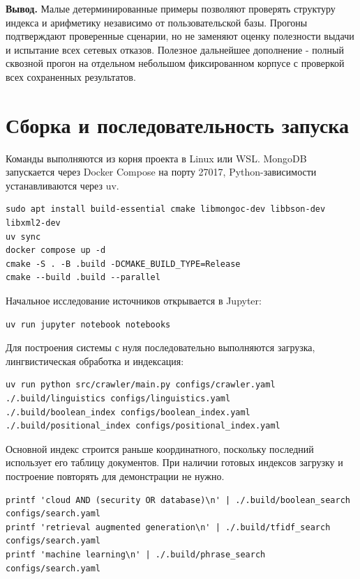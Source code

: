 \documentclass[pdf,unicode,12pt,a4paper,oneside,fleqn]{article}
\newcommand{\partlabel}[1]{\par\Needspace{4\baselineskip}\medskip\textbf{#1.}\quad}
\begin{document}
\partlabel{Вывод}
Малые детерминированные примеры позволяют проверять структуру индекса и
арифметику независимо от пользовательской базы. Прогоны подтверждают
проверенные сценарии, но не заменяют оценку полезности выдачи и испытание
всех сетевых отказов. Полезное дальнейшее дополнение - полный сквозной
прогон на отдельном небольшом фиксированном корпусе с проверкой всех
сохраненных результатов.

\clearpage
\section*{Сборка и последовательность запуска}

Команды выполняются из корня проекта в Linux или WSL. MongoDB запускается
через Docker Compose на порту 27017, Python-зависимости устанавливаются через uv.

\begin{lstlisting}
sudo apt install build-essential cmake libmongoc-dev libbson-dev libxml2-dev
uv sync
docker compose up -d
cmake -S . -B .build -DCMAKE_BUILD_TYPE=Release
cmake --build .build --parallel
\end{lstlisting}

Начальное исследование источников открывается в Jupyter:
\begin{lstlisting}
uv run jupyter notebook notebooks
\end{lstlisting}
Для построения системы с нуля
последовательно выполняются загрузка, лингвистическая обработка и индексация:

\begin{lstlisting}
uv run python src/crawler/main.py configs/crawler.yaml
./.build/linguistics configs/linguistics.yaml
./.build/boolean_index configs/boolean_index.yaml
./.build/positional_index configs/positional_index.yaml
\end{lstlisting}

Основной индекс строится раньше координатного, поскольку последний использует
его таблицу документов. При наличии готовых индексов загрузку и построение
повторять для демонстрации не нужно.

\begin{lstlisting}
printf 'cloud AND (security OR database)\n' | ./.build/boolean_search configs/search.yaml
printf 'retrieval augmented generation\n' | ./.build/tfidf_search configs/search.yaml
printf 'machine learning\n' | ./.build/phrase_search configs/search.yaml
\end{lstlisting}
\end{document}
